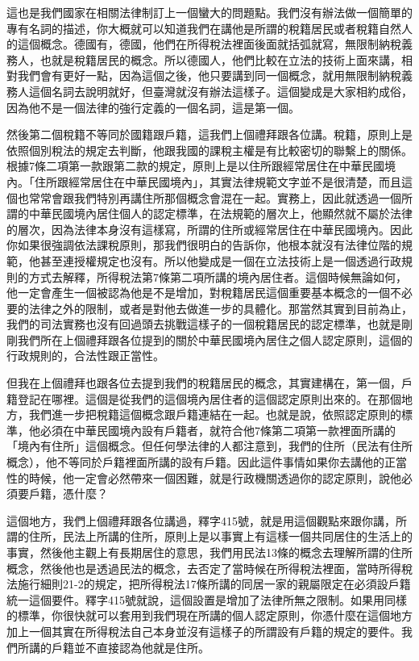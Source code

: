 \documentclass[]{ctexbook}
\begin{document}
這也是我們國家在相關法律制訂上一個蠻大的問題點。我們沒有辦法做一個簡單的專有名詞的描述，你大概就可以知道我們在講他是所謂的稅籍居民或者稅籍自然人的這個概念。德國有，德國，他們在所得稅法裡面後面就括弧就寫，無限制納稅義務人，也就是稅籍居民的概念。所以德國人，他們比較在立法的技術上面來講，相對我們會有更好一點，因為這個之後，他只要講到同一個概念，就用無限制納稅義務人這個名詞去說明就好，但臺灣就沒有辦法這樣子。這個變成是大家相約成俗，因為他不是一個法律的強行定義的一個名詞，這是第一個。

然後第二個稅籍不等同於國籍跟戶籍，這我們上個禮拜跟各位講。稅籍，原則上是依照個別稅法的規定去判斷，他跟我國的課稅主權是有比較密切的聯繫上的關係。根據7條二項第一款跟第二款的規定，原則上是以住所跟經常居住在中華民國境內。「住所跟經常居住在中華民國境內」，其實法律規範文字並不是很清楚，而且這個也常常會跟我們特別再講住所那個概念會混在一起。實務上，因此就透過一個所謂的中華民國境內居住個人的認定標準，在法規範的層次上，他顯然就不屬於法律的層次，因為法律本身沒有這樣寫，所謂的住所或經常居住在中華民國境內。因此你如果很強調依法課稅原則，那我們很明白的告訴你，他根本就沒有法律位階的規範，他甚至連授權規定也沒有。所以他變成是一個在立法技術上是一個透過行政規則的方式去解釋，所得稅法第7條第二項所講的境內居住者。這個時候無論如何，他一定會產生一個被認為他是不是增加，對稅籍居民這個重要基本概念的一個不必要的法律之外的限制，或者是對他去做進一步的具體化。那當然其實到目前為止，我們的司法實務也沒有回過頭去挑戰這樣子的一個稅籍居民的認定標準，也就是剛剛我們所在上個禮拜跟各位提到的關於中華民國境內居住之個人認定原則，這個的行政規則的，合法性跟正當性。

但我在上個禮拜也跟各位去提到我們的稅籍居民的概念，其實建構在，第一個，戶籍登記在哪裡。這個是從我們的這個境內居住者的這個認定原則出來的。在那個地方，我們進一步把稅籍這個概念跟戶籍連結在一起。也就是說，依照認定原則的標準，他必須在中華民國境內設有戶籍者，就符合他7條第二項第一款裡面所講的「境內有住所」這個概念。但任何學法律的人都注意到，我們的住所（民法有住所概念），他不等同於戶籍裡面所講的設有戶籍。因此這件事情如果你去講他的正當性的時候，他一定會必然帶來一個困難，就是行政機關透過你的認定原則，說他必須要戶籍，憑什麼？

這個地方，我們上個禮拜跟各位講過，釋字415號，就是用這個觀點來跟你講，所謂的住所，民法上所講的住所，原則上是以事實上有這樣一個共同居住的生活上的事實，然後他主觀上有長期居住的意思，我們用民法13條的概念去理解所謂的住所概念，然後他也是透過民法的概念，去否定了當時候在所得稅法裡面，當時所得稅法施行細則21-2的規定，把所得稅法17條所講的同居一家的親屬限定在必須設戶籍統一這個要件。釋字415號就說，這個設置是增加了法律所無之限制。如果用同樣的標準，你很快就可以套用到我們現在所講的個人認定原則，你憑什麼在這個地方加上一個其實在所得稅法自己本身並沒有這樣子的所謂設有戶籍的規定的要件。我們所講的戶籍並不直接認為他就是住所。
\end{document}
